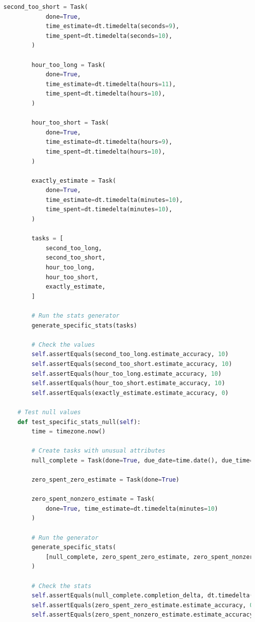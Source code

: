 \documentclass{article}
\begin{document}
\begin{lstlisting}[language=Python]
        second_too_short = Task(
            done=True,
            time_estimate=dt.timedelta(seconds=9),
            time_spent=dt.timedelta(seconds=10),
        )

        hour_too_long = Task(
            done=True,
            time_estimate=dt.timedelta(hours=11),
            time_spent=dt.timedelta(hours=10),
        )

        hour_too_short = Task(
            done=True,
            time_estimate=dt.timedelta(hours=9),
            time_spent=dt.timedelta(hours=10),
        )

        exactly_estimate = Task(
            done=True,
            time_estimate=dt.timedelta(minutes=10),
            time_spent=dt.timedelta(minutes=10),
        )

        tasks = [
            second_too_long,
            second_too_short,
            hour_too_long,
            hour_too_short,
            exactly_estimate,
        ]

        # Run the stats generator
        generate_specific_stats(tasks)

        # Check the values
        self.assertEquals(second_too_long.estimate_accuracy, 10)
        self.assertEquals(second_too_short.estimate_accuracy, 10)
        self.assertEquals(hour_too_long.estimate_accuracy, 10)
        self.assertEquals(hour_too_short.estimate_accuracy, 10)
        self.assertEquals(exactly_estimate.estimate_accuracy, 0)

    # Test null values
    def test_specific_stats_null(self):
        time = timezone.now()

        # Create tasks with unusual attributes
        null_complete = Task(done=True, due_date=time.date(), due_time=time.time(),)

        zero_spent_zero_estimate = Task(done=True)

        zero_spent_nonzero_estimate = Task(
            done=True, time_estimate=dt.timedelta(minutes=10)
        )

        # Run the generator
        generate_specific_stats(
            [null_complete, zero_spent_zero_estimate, zero_spent_nonzero_estimate]
        )

        # Check the stats
        self.assertEquals(null_complete.completion_delta, dt.timedelta(minutes=0))
        self.assertEquals(zero_spent_zero_estimate.estimate_accuracy, 0)
        self.assertEquals(zero_spent_nonzero_estimate.estimate_accuracy, 100)
\end{lstlisting}
\end{document}
